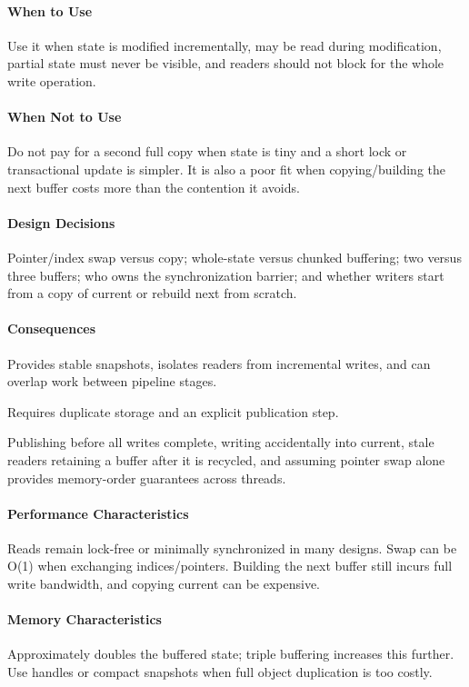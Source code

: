 \documentclass[11pt]{article}
\begin{document}
\paragraph{When to Use} Use it when state is modified incrementally, may be read during modification, partial state must never be visible, and readers should not block for the whole write operation.
\paragraph{When Not to Use} Do not pay for a second full copy when state is tiny and a short lock or transactional update is simpler. It is also a poor fit when copying/building the next buffer costs more than the contention it avoids.
\paragraph{Design Decisions} Pointer/index swap versus copy; whole-state versus chunked buffering; two versus three buffers; who owns the synchronization barrier; and whether writers start from a copy of current or rebuild next from scratch.
\paragraph{Consequences}
\begin{description}[leftmargin=2.7cm,style=nextline]
\item[Benefits] Provides stable snapshots, isolates readers from incremental writes, and can overlap work between pipeline stages.
\item[Costs] Requires duplicate storage and an explicit publication step.
\item[Risks] Publishing before all writes complete, writing accidentally into current, stale readers retaining a buffer after it is recycled, and assuming pointer swap alone provides memory-order guarantees across threads.
\end{description}
\paragraph{Performance Characteristics} Reads remain lock-free or minimally synchronized in many designs. Swap can be O(1) when exchanging indices/pointers. Building the next buffer still incurs full write bandwidth, and copying current can be expensive.
\paragraph{Memory Characteristics} Approximately doubles the buffered state; triple buffering increases this further. Use handles or compact snapshots when full object duplication is too costly.
\end{document}
